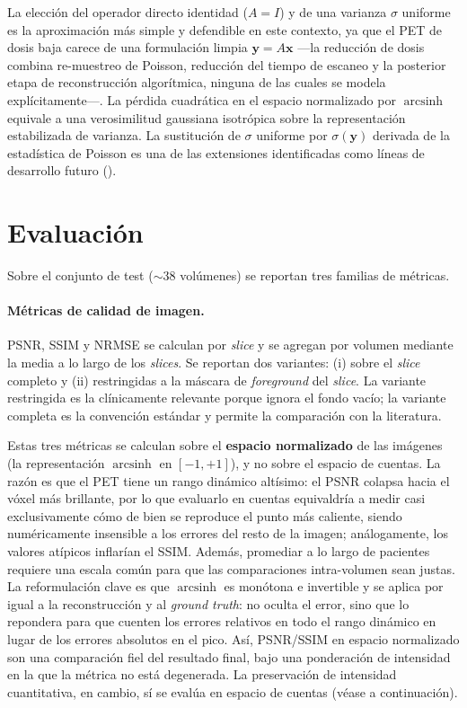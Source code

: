 La elección del operador directo identidad ($A = I$) y de una
varianza $\sigma$ uniforme es la aproximación más simple y
defendible en este contexto, ya que el PET de dosis baja carece
de una formulación limpia $\mathbf{y} = A\mathbf{x}$ —la
reducción de dosis combina re-muestreo de Poisson, reducción
del tiempo de escaneo y la posterior etapa de reconstrucción
algorítmica, ninguna de las cuales se modela explícitamente—.
La pérdida cuadrática en el espacio normalizado por
$\operatorname{arcsinh}$ equivale a una verosimilitud gaussiana
isotrópica sobre la representación estabilizada de varianza. La
sustitución de $\sigma$ uniforme por $\sigma(\mathbf{y})$ derivada
de la estadística de Poisson es una de las extensiones
identificadas como líneas de desarrollo futuro
().

\section{Evaluación}
\label{sec:pet-evaluacion}

Sobre el conjunto de test ($\sim 38$ volúmenes) se reportan tres
familias de métricas.

\paragraph{Métricas de calidad de imagen.}
PSNR, SSIM y NRMSE se calculan por \textit{slice} y se agregan
por volumen mediante la media a lo largo de los \textit{slices}.
Se reportan dos variantes: (i) sobre el \textit{slice} completo
y (ii) restringidas a la máscara de \textit{foreground} del
\textit{slice}. La variante restringida es la clínicamente
relevante porque ignora el fondo vacío; la variante completa es
la convención estándar y permite la comparación con la literatura.

Estas tres métricas se calculan sobre el \textbf{espacio
normalizado} de las imágenes (la representación
$\operatorname{arcsinh}$ en $[-1, +1]$), y no sobre el espacio de
cuentas. La razón es que el PET tiene un rango dinámico altísimo:
el PSNR colapsa hacia el vóxel más brillante, por lo que evaluarlo
en cuentas equivaldría a medir casi exclusivamente cómo de bien se
reproduce el punto más caliente, siendo numéricamente insensible
a los errores del resto de la imagen; análogamente, los valores
atípicos inflarían el SSIM. Además, promediar a lo largo de
pacientes requiere una escala común para que las comparaciones
intra-volumen sean justas. La reformulación clave es que
$\operatorname{arcsinh}$ es monótona e invertible y se aplica por
igual a la reconstrucción y al \textit{ground truth}: no oculta el
error, sino que lo repondera para que cuenten los errores
relativos en todo el rango dinámico en lugar de los errores
absolutos en el pico. Así, PSNR/SSIM en espacio normalizado son
una comparación fiel del resultado final, bajo una ponderación de
intensidad en la que la métrica no está degenerada. La
preservación de intensidad cuantitativa, en cambio, sí se evalúa
en espacio de cuentas (véase a continuación).

